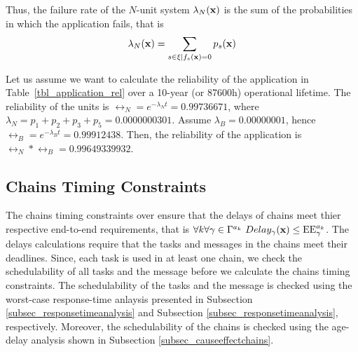 Thus, the failure rate of the $N$-unit system $\lambda_N(\textbf{x})$ is the sum of the probabilities in which the application fails, that is
\[
	\lambda_N(\textbf{x})=\sum_{s\in \xi|f_s(\textbf{x})=0}p_s(\textbf{x})
\]
\begin{example}
Let us assume we want to calculate the reliability of the application in Table~\ref{tbl_application_rel} over a 10-year (or 87600h) operational lifetime. The reliability of the units is $\rel_N=e^{-\lambda_N t}=0.99736671$, where $\lambda_N=p_1+p_2+p_3+p_5=0.0000000301$. Assume $\lambda_B=0.00000001$, hence $\rel_B=e^{-\lambda_B t}=0.99912438$. Then, the reliability of the application is $\rel_N*\rel_B=0.99649339932$.
\end{example}



\subsection{Chains Timing Constraints}
The chains timing constraints over \ttx ensure that the delays of chains meet thier respective end-to-end requirements, that is $\forall k\forall \gamma\in \ssp{\Gamma}\ Delay_\gamma(\x)\leq \sss{\mathrm{EE}}[k][\gamma]$. The delays calculations require that the tasks and messages in the chains meet their deadlines. Since, each task is used in at least one chain, we check the schedulability of all tasks and the message  before we calculate the chains timing constraints. The schedulability of the tasks and the message is checked using the worst-case response-time anlaysis presented in Subsection \ref{subsec_responsetimeanalysis} and  Subsection \ref{subsec_responsetimeanalysis}, respectively. Moreover, the schedulability of the chains is checked using the age-delay analysis shown in Subsection \ref{subsec_causeeffectchains}. 

